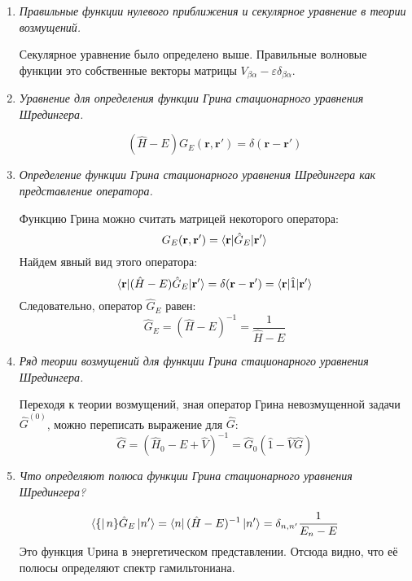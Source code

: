\documentclass{article}
\begin{document}
\begin{enumerate}
		\item \textit{Правильные функции нулевого приближения и секулярное уравнение в теории возмущений.}
		
		Секулярное уравнение было определено выше. Правильные волновые функции это собственные векторы матрицы $V_{\beta\alpha} - \varepsilon \delta_{\beta\alpha}$.
		
		\item \textit{Уравнение для определения функции Грина стационарного уравнения Шредингера.}
		
		\begin{equation}
			(\hat{H} - E) G_E(\textbf{r}, \textbf{r}') = \delta(\textbf{r} - \textbf{r}')
		\end{equation}
		\item \textit{Определение функции Грина стационарного уравнения Шредингера как представление оператора.}
		
		Функцию Грина можно считать матрицей некоторого оператора:
		\begin{equation}
			G_E(\textbf{r}, \textbf{r}') = \braket{\textbf{r}|\hat{G}_E|\textbf{r}'}
		\end{equation}
		Найдем явный вид этого оператора:
		\begin{equation}
			\braket{\textbf{r}|(\hat{H} - E)\hat{G}_E | \textbf{r}'} = \delta (\textbf{r} - \textbf{r}') = \braket{\textbf{r}|\hat{1}| \textbf{r}'}
		\end{equation}
		Следовательно, оператор $\hat{G}_E$ равен:
		\begin{equation}
			\hat{G}_E = (\hat{H} - E)^{-1} = \frac{1}{\hat{H} - E}
		\end{equation}
		
		\item \textit{Ряд теории возмущений для функции Грина стационарного уравнения Шредингера.}
		
		Переходя к теории возмущений, зная оператор Грина невозмущенной задачи $\hat{G}^{(0)}$, можно переписать выражение для $\hat{G}$:
		\begin{equation}
			\hat{G} = (\hat{H}_0 - E + \hat{V})^{-1} = \hat{G}_0 (\hat{1} - \hat{V}\hat{G})
		\end{equation}
		
		
		\item \textit{Что определяют полюса функции Грина стационарного уравнения Шредингера?}	
		
		\begin{equation}
			\bra\{n\}\hat{G}_{E}\ket{n'}=\bra{n}(\hat{H}-E)^{-1}\ket{n'}=\delta_{n,n'}\frac{1}{E_{n}-E}
		\end{equation}
		Это функция Uрина в энергетическом представлении. Отсюда видно,
что её полюсы определяют спектр гамильтониана.


\end{enumerate}
\end{document}
